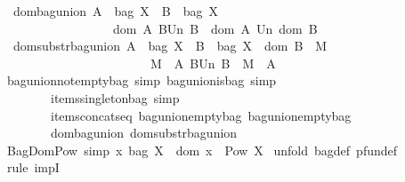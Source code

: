 \begin{isabellebody}
\ \ dom{\isacharunderscore}bagunion{\isacharcolon}\ {\isachardoublequoteopen}A\ {\isacharcolon}\ bag\ X\ {\isacharminus}{\isacharminus}{\isachargreater}\ B\ {\isacharcolon}\ bag\ X\ {\isacharminus}{\isacharminus}{\isachargreater}\ \isanewline
\ \ \ \ \ \ \ \ \ \ \ \ \ \ \ \ \ \ {\isacharparenleft}dom\ {\isacharparenleft}A\ BUn\ B{\isacharparenright}{\isacharparenright}\ {\isacharequal}\ {\isacharparenleft}{\isacharparenleft}dom\ A{\isacharparenright}\ Un\ {\isacharparenleft}dom\ B{\isacharparenright}{\isacharparenright}{\isachardoublequoteclose}\isanewline
\ \ domsubstr{\isacharunderscore}bagunion{\isacharcolon}\ {\isachardoublequoteopen}A\ {\isacharcolon}\ bag\ X\ {\isacharminus}{\isacharminus}{\isachargreater}\ B\ {\isacharcolon}\ bag\ X\ {\isacharminus}{\isacharminus}{\isachargreater}\ dom\ B\ {\isacharless}{\isacharequal}\ M\ {\isacharminus}{\isacharminus}{\isachargreater}\isanewline
\ \ \ \ \ \ \ \ \ \ \ \ \ \ \ \ \ \ \ \ \ \ \ \ {\isacharparenleft}{\isacharparenleft}M\ {\isacharless}{\isacharminus}{\isacharcolon}\ {\isacharparenleft}A\ BUn\ B{\isacharparenright}{\isacharparenright}\ {\isacharequal}\ {\isacharparenleft}M\ {\isacharless}{\isacharminus}{\isacharcolon}\ A{\isacharparenright}{\isacharparenright}{\isachardoublequoteclose}\isanewline
\isanewline
\isanewline
\isanewline
{}\isamarkupfalse%
\ bagunion{\isacharunderscore}not{\isacharunderscore}emptybag\ {\isacharbrackleft}simp{\isacharbrackright}\ bagunion{\isacharunderscore}is{\isacharunderscore}bag\ {\isacharbrackleft}simp{\isacharbrackright}\ \isanewline
\ \ \ \ \ \ \ \ items{\isacharunderscore}singletonbag\ {\isacharbrackleft}simp{\isacharbrackright}\ \isanewline
\ \ \ \ \ \ \ \ items{\isacharunderscore}concatseq\ bagunion{\isacharunderscore}emptybag\ bagunion{\isacharunderscore}emptybag{}\ \isanewline
\ \ \ \ \ \ \ \ dom{\isacharunderscore}bagunion\ domsubstr{\isacharunderscore}bagunion%
\isamarkuptrue%
\isamarkupfalse%
\ BagDomPow\ {\isacharbrackleft}simp{\isacharbrackright}{\isacharcolon}\ {\isachardoublequoteopen}x{\isacharcolon}\ bag\ X\ {\isacharminus}{\isacharminus}{\isachargreater}\ dom\ x\ {\isacharcolon}\ {\isacharparenleft}Pow\ X{\isacharparenright}{\isachardoublequoteclose}\isanewline
%
\isadelimproof
%
\endisadelimproof
%
\isatagproof
{}\isamarkupfalse%
\ {\isacharparenleft}unfold\ bag{\isacharunderscore}def\ pfun{\isacharunderscore}def{\isacharparenright}\isanewline
{}\isamarkupfalse%
\ {\isacharparenleft}rule\ impI{\isacharparenright}\isanewline
{}\isamarkupfalse%

\end{isabellebody}
